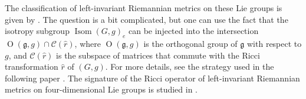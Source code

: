 \documentclass[12pt,a4paper,twoside]{article}
\theoremstyle{definition}
\begin{document}
The classification of left-invariant Riemannian metrics on these Lie groups is given by \cite{van2017metrics,aitbenhaddou2025classification}. The question is a bit complicated, but one can use the fact that the isotropy subgroup $\operatorname{Isom}(G, g)_e$ can be injected into the intersection $\operatorname{O}(\mathfrak{g}, g) \cap \mathcal{C}(\hat{r})$, where $\operatorname{O}(\mathfrak{g}, g)$ is the orthogonal group of $\mathfrak{g}$ with respect to $g$, and $\mathcal{C}(\hat{r})$ is the subspace of matrices that commute with the Ricci transformation $\hat{r}$ of $(G, g)$. For more details, see the strategy used in the following paper \cite{aitbenhaddou2024isometry}. The signature of the Ricci operator of left-invariant Riemannian metrics on four-dimensional Lie groups is studied in \cite{kremlev2009signature,kremlev2010signature}.
\end{document}
